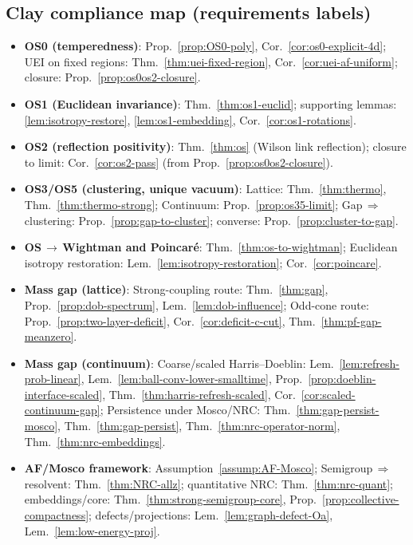 \documentclass[11pt]{amsart}
\theoremstyle{plain}
\theoremstyle{definition}
\theoremstyle{remark}
\begin{document}
\subsection*{Clay compliance map (requirements \textrightarrow{} labels)}
\begin{itemize}
  \item \textbf{OS0 (temperedness)}: Prop.~\ref{prop:OS0-poly}, Cor.~\ref{cor:os0-explicit-4d}; UEI on fixed regions: Thm.~\ref{thm:uei-fixed-region}, Cor.~\ref{cor:uei-af-uniform}; closure: Prop.~\ref{prop:os0os2-closure}.
  \item \textbf{OS1 (Euclidean invariance)}: Thm.~\ref{thm:os1-euclid}; supporting lemmas: \ref{lem:isotropy-restore}, \ref{lem:os1-embedding}, Cor.~\ref{cor:os1-rotations}.
  \item \textbf{OS2 (reflection positivity)}: Thm.~\ref{thm:os} (Wilson link reflection); closure to limit: Cor.~\ref{cor:os2-pass} (from Prop.~\ref{prop:os0os2-closure}).
  \item \textbf{OS3/OS5 (clustering, unique vacuum)}: Lattice: Thm.~\ref{thm:thermo}, Thm.~\ref{thm:thermo-strong}; Continuum: Prop.~\ref{prop:os35-limit}; Gap\,$\Rightarrow$\,clustering: Prop.~\ref{prop:gap-to-cluster}; converse: Prop.~\ref{prop:cluster-to-gap}.
  \item \textbf{OS\,$\to$\,Wightman and Poincar\'e}: Thm.~\ref{thm:os-to-wightman}; Euclidean isotropy restoration: Lem.~\ref{lem:isotropy-restoration}; Cor.~\ref{cor:poincare}.
  \item \textbf{Mass gap (lattice)}: Strong-coupling route: Thm.~\ref{thm:gap}, Prop.~\ref{prop:dob-spectrum}, Lem.~\ref{lem:dob-influence}; Odd-cone route: Prop.~\ref{prop:two-layer-deficit}, Cor.~\ref{cor:deficit-c-cut}, Thm.~\ref{thm:pf-gap-meanzero}.
  \item \textbf{Mass gap (continuum)}: Coarse/scaled Harris--Doeblin: Lem.~\ref{lem:refresh-prob-linear}, Lem.~\ref{lem:ball-conv-lower-smalltime}, Prop.~\ref{prop:doeblin-interface-scaled}, Thm.~\ref{thm:harris-refresh-scaled}, Cor.~\ref{cor:scaled-continuum-gap}; Persistence under Mosco/NRC: Thm.~\ref{thm:gap-persist-mosco}, Thm.~\ref{thm:gap-persist}, Thm.~\ref{thm:nrc-operator-norm}, Thm.~\ref{thm:nrc-embeddings}.
  \item \textbf{AF/Mosco framework}: Assumption~\ref{assump:AF-Mosco}; Semigroup\,$\Rightarrow$\,resolvent: Thm.~\ref{thm:NRC-allz}; quantitative NRC: Thm.~\ref{thm:nrc-quant}; embeddings/core: Thm.~\ref{thm:strong-semigroup-core}, Prop.~\ref{prop:collective-compactness}; defects/projections: Lem.~\ref{lem:graph-defect-Oa}, Lem.~\ref{lem:low-energy-proj}.

\end{itemize}
\end{document}
